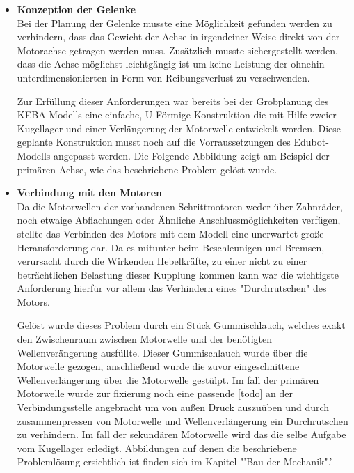 \begin{itemize}
\item \textbf{Konzeption der Gelenke}\\
Bei der Planung der Gelenke musste eine Möglichkeit gefunden werden zu verhindern, dass das Gewicht der Achse in irgendeiner Weise direkt von der Motorachse getragen werden muss. Zusätzlich musste sichergestellt werden, dass die Achse möglichst leichtgängig ist um keine Leistung der ohnehin unterdimensionierten in Form von Reibungsverlust zu verschwenden.

Zur Erfüllung dieser Anforderungen war bereits bei der Grobplanung des KEBA Modells eine einfache, U-Förmige Konstruktion die mit Hilfe zweier Kugellager und einer Verlängerung der Motorwelle entwickelt worden. Diese geplante Konstruktion musst noch auf die Vorraussetzungen des Edubot-Modells angepasst werden. Die Folgende Abbildung zeigt am Beispiel der primären Achse, wie das beschriebene Problem gelöst wurde.
\item \textbf{Verbindung mit den Motoren}\\
Da die Motorwellen der vorhandenen Schrittmotoren weder über Zahnräder, noch etwaige Abflachungen oder Ähnliche Anschlussmöglichkeiten verfügen, stellte das Verbinden des Motors mit dem Modell eine unerwartet große Herausforderung dar. Da es mitunter beim Beschleunigen und Bremsen, verursacht durch die Wirkenden Hebelkräfte, zu einer nicht zu einer beträchtlichen Belastung dieser Kupplung kommen kann war die wichtigste Anforderung hierfür vor allem das Verhindern eines "Durchrutschen" des Motors. 

Gelöst wurde dieses Problem durch ein Stück Gummischlauch, welches exakt den Zwischenraum zwischen Motorwelle und der benötigten Wellenverängerung ausfüllte. Dieser Gummischlauch wurde über die Motorwelle gezogen, anschließend wurde die zuvor eingeschnittene Wellenverlängerung über die Motorwelle gestülpt. Im fall der primären Motorwelle wurde zur fixierung noch eine passende [todo] an der Verbindungsstelle angebracht um von außen Druck auszuüben und durch zusammenpressen von Motorwelle und Wellenverlängerung ein Durchrutschen zu verhindern. Im fall der sekundären Motorwelle wird das die selbe Aufgabe vom Kugellager erledigt. Abbildungen auf denen die beschriebene Problemlösung ersichtlich ist finden sich im Kapitel "'Bau der Mechanik".'
\end{itemize}
